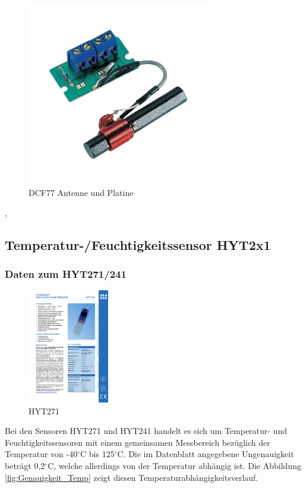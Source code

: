 			\begin{figure}[H]
				\centering
				\includegraphics[width=0.6\linewidth,height = 8cm]{Grafiken/DCF77}
				\caption[DCF77 Antenne und Platine]{DCF77 Antenne und Platine\protect\footnotemark}
				\label{fig:DCF77}
			\end{figure}
			
			\cite{DCF77}, \cite{DCF77Manual}
		\subsection{Temperatur-/Feuchtigkeitssensor HYT2x1}
			\subsubsection{Daten zum HYT271/241}
				\begin{figure}[H]
				\centering
				\includegraphics[height=5cm]{./Grafiken/HYT271}
				\caption[HYT271]{HYT271\protect\footnotemark}
				\label{fig:HYT271}
				\end{figure}
				
				Bei den Sensoren HYT271 und HYT241 handelt es sich um Temperatur- und Feuchtigkeitssensoren mit einem gemeinsamen Messbereich bezüglich der Temperatur von -40$^{\circ}$C bis 125$^{\circ}$C. Die im Datenblatt angegebene Ungenauigkeit beträgt 0,2$^{\circ}$C, welche allerdings von der Temperatur abhängig ist. Die Abbildung \ref{fig:Genauigkeit_Temp} zeigt diesen Temperaturabhängigkeitsverlauf.
				
